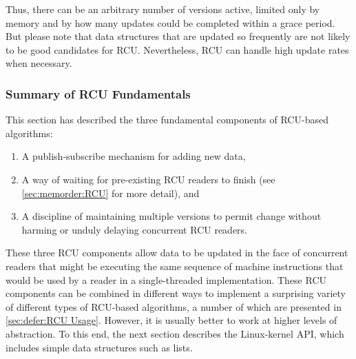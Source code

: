 {{	Thus, there can be an arbitrary number of versions active,
	limited only by memory and by how many updates could be completed
	within a grace period.
	But please note that data structures that are updated so frequently
	are not likely to be good candidates for RCU\@.
	Nevertheless, RCU can handle high update rates when necessary.
}\QuickQuizEndE
}

\subsubsection{Summary of RCU Fundamentals}
\label{sec:defer:Summary of RCU Fundamentals}

This section has described the three fundamental components of RCU-based
algorithms:

\begin{enumerate}
\item	A publish-subscribe mechanism for adding new data,

\item	A way of waiting for pre-existing RCU readers to finish
	(see \cref{sec:memorder:RCU} for more detail),
	and

\item	A discipline of maintaining multiple versions to permit
	change without harming or unduly delaying concurrent RCU readers.
\end{enumerate}

\QuickQuizEnd

These three RCU components allow data to be updated in the face of concurrent
readers that might be executing the same sequence of machine instructions
that would be used by a reader in a single-threaded implementation.
These RCU components can be combined in different ways to implement a
surprising variety of different types of RCU-based algorithms, a number
of which are presented in
\cref{sec:defer:RCU Usage}.
However, it is usually better to work at higher levels of abstraction.
To this end, the next section describes the Linux-kernel API, which
includes simple data structures such as lists.
